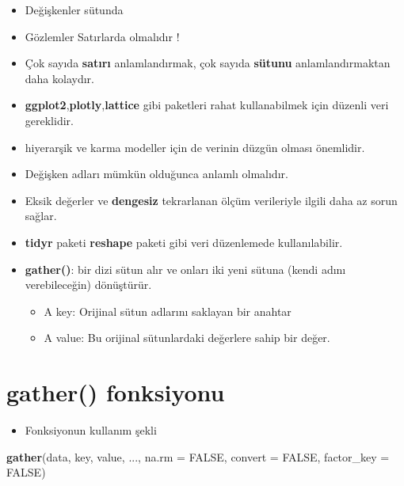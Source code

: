 \documentclass[
  oneside]{book}
\newenvironment{Shaded}{\begin{snugshade}}{\end{snugshade}}
\newcommand{\AttributeTok}[1]{\textcolor[rgb]{0.13,0.29,0.53}{#1}}
\newcommand{\ConstantTok}[1]{\textcolor[rgb]{0.56,0.35,0.01}{#1}}
\newcommand{\FunctionTok}[1]{\textcolor[rgb]{0.13,0.29,0.53}{\textbf{#1}}}
\newcommand{\NormalTok}[1]{#1}
\providecommand{\tightlist}{%
  \setlength{\itemsep}{0pt}\setlength{\parskip}{0pt}}
\begin{document}
\begin{itemize}
\item
  Değişkenler sütunda
\item
  Gözlemler Satırlarda olmalıdır !
\item
  Çok sayıda \textbf{satırı} anlamlandırmak, çok sayıda \textbf{sütunu} anlamlandırmaktan daha kolaydır.
\item
  \textbf{ggplot2},\textbf{plotly},\textbf{lattice} gibi paketleri rahat kullanabilmek için düzenli veri gereklidir.
\item
  hiyerarşik ve karma modeller için de verinin düzgün olması önemlidir.
\item
  Değişken adları mümkün olduğunca anlamlı olmalıdır.
\item
  Eksik değerler ve \textbf{dengesiz} tekrarlanan ölçüm verileriyle ilgili daha az sorun sağlar.
\item
  \textbf{tidyr} paketi \textbf{reshape} paketi gibi veri düzenlemede kullanılabilir.
\item
  \textbf{gather()}: bir dizi sütun alır ve onları iki yeni sütuna (kendi adını verebileceğin) dönüştürür.

  \begin{itemize}
  \tightlist
  \item
    A key: Orijinal sütun adlarını saklayan bir anahtar
  \item
    A value: Bu orijinal sütunlardaki değerlere sahip bir değer.
  \end{itemize}
\end{itemize}

\hypertarget{gather-fonksiyonu}{%
\section{\texorpdfstring{\textbf{gather()} fonksiyonu}{gather() fonksiyonu}}\label{gather-fonksiyonu}}

\begin{itemize}
\tightlist
\item
  Fonksiyonun kullanım şekli
\end{itemize}

\begin{Shaded}
\begin{Highlighting}[]
\FunctionTok{gather}\NormalTok{(data, key, value, ..., }\AttributeTok{na.rm =} \ConstantTok{FALSE}\NormalTok{, }
       \AttributeTok{convert =} \ConstantTok{FALSE}\NormalTok{, }\AttributeTok{factor\_key =} \ConstantTok{FALSE}\NormalTok{)}
\end{Highlighting}
\end{Shaded}
\end{document}
